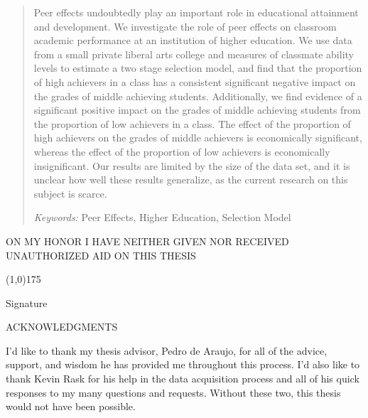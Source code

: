 \begin{abstract}
  \noindent 
Peer effects undoubtedly play an important role in educational attainment and development. 
We investigate the role of peer effects on classroom academic performance at an institution of higher education. 
We use data from a small private liberal arts college and measures of classmate ability levels to estimate a two stage selection model, and find that the proportion of high achievers in a class has a consistent significant negative impact on the grades of middle achieving students.
Additionally, we find evidence of a significant positive impact on the grades of middle achieving students from the proportion of low achievers in a class. 
The effect of the proportion of high achievers on the grades of middle achievers is economically significant, whereas the effect of the proportion of low achievers is economically insignificant. 
Our results are limited by the size of the data set, and it is unclear how well these results generalize, as the current research on this subject is scarce. 

\bigskip

\noindent \emph{Keywords: }Peer Effects, Higher Education, Selection Model

\end{abstract}

\newpage{}

\vspace*{7cm}
\begin{changemargin}{1.75cm}{1.75cm}
  ON MY HONOR I HAVE NEITHER GIVEN NOR RECEIVED UNAUTHORIZED AID ON THIS THESIS
\end{changemargin}
\vspace{7cm}
\begin{changemargin}{9cm}{1.75cm}
  \begin{center}
    \line(1,0){175}
  \end{center}
  \vspace{-.5cm}
  Signature
\end{changemargin}

\newpage{}

\begin{center}
  \LARGE ACKNOWLEDGMENTS
\end{center}

I'd like to thank my thesis advisor, Pedro de Araujo, for all of the advice, support, and wisdom he has provided me throughout this process. I'd also like to thank Kevin Rask for his help in the data acquisition process and all of his quick responses to my many questions and requests. Without these two, this thesis would not have been possible. 

\newpage{}

\thispagestyle{plain}
\tableofcontents

\newpage
